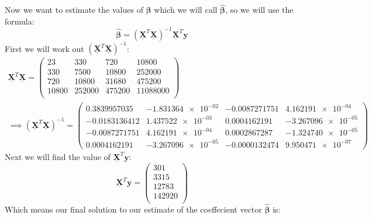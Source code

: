 \documentclass[12pt]{article}
\newcommand{\vect}[1]{\boldsymbol{#1}}
\newcommand{\mat}[1]{\underline{\boldsymbol{#1}}}
\newcommand{\trans}[1]{#1^T}
\newcommand{\est}[1]{\hat{#1}}
\begin{document}
Now we want to estimate the values of $\vect{\beta}$ which we will call $\est{\vect{\beta}}$, so we will use the formula:
\begin{equation*}
\est{\vect{\beta}} = (\trans{\mat{X}}\mat{X})^{-1}\trans{\mat{X}}\vect{y}
\end{equation*}
First we will work out $(\trans{\mat{X}}\mat{X})^{-1}$:
\begin{gather}
  \trans{\mat{X}}\mat{X} =
  \begin{pmatrix}
    23    &   330     &   720      &   10800      \\
   330    &   7500    &   10800    &   252000     \\
   720    &   10800   &   31680    &   475200     \\
   10800  &   252000  &   475200   &   11088000   \\
 \end{pmatrix} \\
 \implies (\trans{\mat{X}}\mat{X})^{-1} =
 \begin{pmatrix} \label{lin_(X^TX)^-1}
    0.3839957035    &   \num{-1.831364e-02}   &   -0.0087271751    &   \num{4.162191e-04 } \\
   -0.0183136412    &   \num{1.437522e-03 }   &    0.0004162191    &   \num{-3.267096e-05} \\
   -0.0087271751    &   \num{4.162191e-04 }   &    0.0002867287    &   \num{-1.324740e-05} \\
    0.0004162191    &   \num{-3.267096e-05}   &   -0.0000132474    &   \num{ 9.950471e-07}
 \end{pmatrix}
\end{gather}
Next we will find the value of $\trans{\mat{X}}\vect{y}$:
\begin{equation*}
  \trans{\mat{X}}\vect{y} =
  \begin{pmatrix}
    301     \\
    3315    \\
    12783   \\
    142920  \\
  \end{pmatrix}
\end{equation*}
Which means our final solution to our estimate of the coeffecient vector $\est{\vect{\beta}}$ is:
\end{document}
